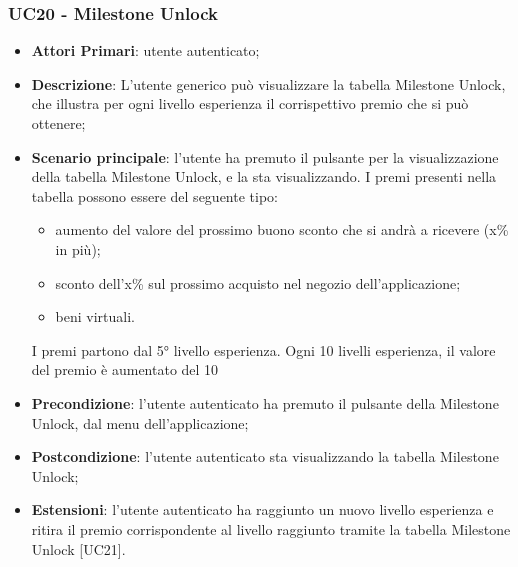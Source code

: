

\subsubsection{UC20 - Milestone Unlock}
\begin{itemize}
	\item \textbf{Attori Primari}: utente autenticato;
	\item \textbf{Descrizione}: L'utente generico può visualizzare la tabella Milestone Unlock\glo, che illustra per ogni livello esperienza il corrispettivo premio che si può ottenere;	
	\item \textbf{Scenario principale}: l'utente ha premuto il pulsante per la visualizzazione della tabella Milestone Unlock, e la sta visualizzando.
	I premi presenti nella tabella possono essere del seguente tipo:
	\begin{itemize}
		\item aumento del valore del prossimo buono sconto che si andrà a ricevere (x\% in più);
		\item sconto dell'x\% sul prossimo acquisto nel negozio dell'applicazione;
		\item beni virtuali.
	\end{itemize}
	I premi partono dal 5° livello esperienza.
	Ogni 10 livelli esperienza, il valore del premio è aumentato del 10%
	\item \textbf{Precondizione}: l'utente autenticato ha premuto il pulsante della Milestone Unlock, dal menu dell'applicazione;
	\item \textbf{Postcondizione}: l'utente autenticato sta visualizzando la tabella Milestone Unlock;
	\item \textbf{Estensioni}:
			l'utente autenticato ha raggiunto un nuovo livello esperienza e ritira il premio corrispondente al livello raggiunto tramite la tabella Milestone Unlock [UC21].
 

\end{itemize}

